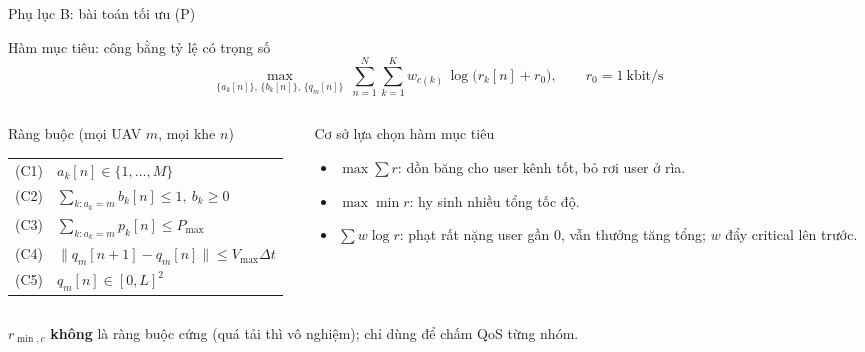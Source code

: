 \documentclass[aspectratio=169,10pt,t]{beamer}
\begin{document}
\begin{frame}{Phụ lục B: bài toán tối ưu (P)}
\begin{block}{Hàm mục tiêu: công bằng tỷ lệ có trọng số}
\vspace{-3mm}
\[
\max_{\{a_k[n]\},\,\{b_k[n]\},\,\{q_m[n]\}}\ \sum_{n=1}^{N}\sum_{k=1}^{K} w_{c(k)}\,\log\big(r_k[n] + r_0\big),\qquad r_0 = 1\ \text{kbit/s}
\]
\end{block}
\begin{columns}[T,onlytextwidth]
\begin{column}{0.55\textwidth}
\vspace{0pt}
  \begin{block}{Ràng buộc (mọi UAV $m$, mọi khe $n$)}
    \small
    \begin{tabular}{@{}ll@{}}
      (C1) & $a_k[n] \in \{1,\dots,M\}$\\
      (C2) & $\sum_{k:a_k=m} b_k[n] \le 1,\ b_k \ge 0$\\
      (C3) & $\sum_{k:a_k=m} p_k[n] \le P_{\max}$\\
      (C4) & $\|q_m[n+1] - q_m[n]\| \le V_{\max}\Delta t$\\
      (C5) & $q_m[n] \in [0, L]^2$
    \end{tabular}
  \end{block}
\end{column}
\begin{column}{0.41\textwidth}
\vspace{0pt}
  \begin{block}{Cơ sở lựa chọn hàm mục tiêu}
    \scriptsize
    \begin{itemize}
      \item $\max\sum r$: dồn băng cho user kênh tốt, bỏ rơi user ở rìa.
      \item $\max\min r$: hy sinh nhiều tổng tốc độ.
      \item $\sum w\log r$: phạt rất nặng user gần 0, vẫn thưởng tăng tổng; $w$ đẩy critical lên trước.
    \end{itemize}
  \end{block}
\end{column}
\end{columns}
\vspace{1mm}
\scriptsize $r_{\min,c}$ \textbf{không} là ràng buộc cứng (quá tải thì vô nghiệm); chỉ dùng để chấm QoS từng nhóm.
\end{frame}
\end{document}
